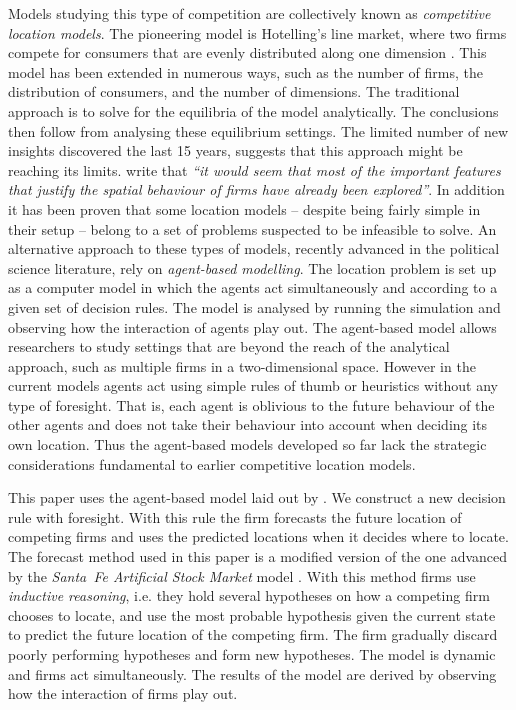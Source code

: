 \documentclass[preprint, 12pt]{elsarticle}
\begin{document}
Models studying this type of competition are collectively known as \emph{competitive location models}. The pioneering model is Hotelling's line market, where two firms compete for consumers that are evenly distributed along one dimension \citep{Hotelling_1929}. This model has been extended in numerous ways, such as the number of firms, the distribution of consumers, and the number of dimensions. The traditional approach is to solve for the equilibria of the model analytically. The conclusions then follow from analysing these equilibrium settings. The limited number of new insights discovered the last 15 years, suggests that this approach might be reaching its limits. \citet[p.~869]{Biscaia_Mota_2013} write that \emph{``it would seem that most of the important features that justify the spatial behaviour of firms have already been explored''}. In addition it has been proven that some location models -- despite being fairly simple in their setup -- belong to a set of problems suspected to be infeasible to solve. An alternative approach to these types of models, recently advanced in the political science literature, rely on \emph{agent-based modelling}. The location problem is set up as a computer model in which the agents act simultaneously and according to a given set of decision rules. The model is analysed by running the simulation and observing how the interaction of agents play out. The agent-based model allows researchers to study settings that are beyond the reach of the analytical approach, such as multiple firms in a two-dimensional space. However in the current models agents act using simple rules of thumb or heuristics without any type of foresight. That is, each agent is oblivious to the future behaviour of the other agents and does not take their behaviour into account when deciding its own location. Thus the agent-based models developed so far lack the strategic considerations fundamental to earlier competitive location models.

This paper uses the agent-based model laid out by \citet{Laver_Sergenti_2011}. We construct a new decision rule with foresight. With this rule the firm forecasts the future location of competing firms and uses the predicted locations when it decides where to locate. The forecast method used in this paper is a modified version of the one advanced by the \emph{Santa~Fe Artificial Stock Market} model \citep[chapter~11]{Arthur_2014}. With this method firms use \emph{inductive reasoning}, i.e. they hold several hypotheses on how a competing firm chooses to locate, and use the most probable hypothesis given the current state to predict the future location of the competing firm. The firm gradually discard poorly performing hypotheses and form new hypotheses. The model is dynamic and firms act simultaneously. The results of the model are derived by observing how the interaction of firms play out. 
\end{document}
